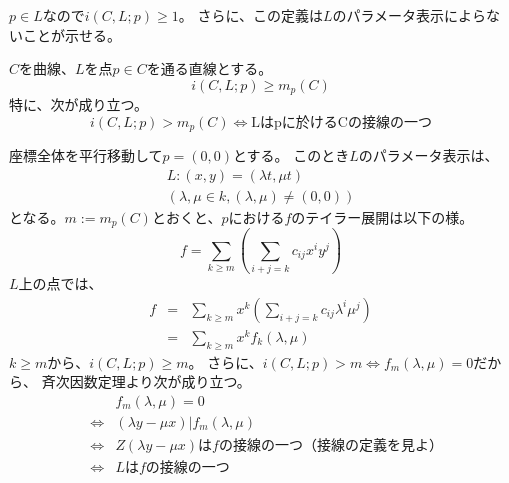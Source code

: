 \documentclass[a4]{article}
\begin{document}
        $p \in L$なので$i(C, L; p) \geq 1$。
        さらに、この定義は$L$のパラメータ表示によらないことが示せる。
        
        \begin{Prop}
              $C$を曲線、$L$を点$p \in C$を通る直線とする。
            \[
                i(C, L; p) \geq m_p(C)
            \]
            特に、次が成り立つ。
            \[
                i(C, L; p) > m_p(C) \iff \mbox{Lはpに於けるCの接線の一つ}
            \]
        \end{Prop}
        
        \begin{Proof}
              座標全体を平行移動して$p=(0, 0)$とする。
              このとき$L$のパラメータ表示は、
              \begin{gather*}
                  L: (x, y)=(\lambda t, \mu t) \\
                  (\lambda, \mu \in k, (\lambda, \mu) \neq (0, 0))
              \end{gather*}
              となる。$m:=m_p(C)$とおくと、$p$における$f$のテイラー展開は以下の様。
              \[
                  f=\sum_{k \geq m}{ \left( \sum_{i+j=k}{c_{ij} x^{i} y^{j}} \right) }
              \]
              $L$上の点では、
              \begin{eqnarray*}
                  f
                  &=&\sum_{k \geq m}{ x^k \left( \sum_{i+j=k}{c_{ij} \lambda^{i} \mu^{j}} \right) } \\
                  &=&\sum_{k \geq m}{ x^k f_k(\lambda, \mu) }
              \end{eqnarray*}
              $k \geq m$から、$i(C, L; p) \geq m$。
              さらに、$i(C, L; p) > m \iff f_m(\lambda, \mu)=0$だから、
              斉次因数定理より次が成り立つ。
              \begin{eqnarray*}
                  &{}& f_m(\lambda, \mu)=0 \\ 
                  &\iff& (\lambda y - \mu x) | f_m(\lambda, \mu) \\
                  &\iff& Z(\lambda y - \mu x)\mbox{は$f$の接線の一つ（接線の定義を見よ）} \\
                  &\iff& L\mbox{は$f$の接線の一つ}
              \end{eqnarray*}
              \QED
        \end{Proof}
        
\end{document}

